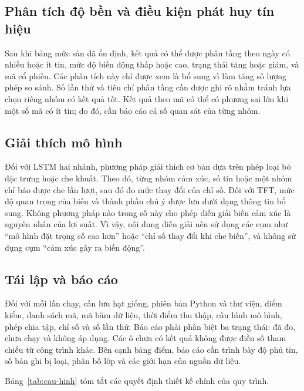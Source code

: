 \documentclass[12pt, a4paper, oneside]{report}
\begin{document}
\subsection{Phân tích độ bền và điều kiện phát huy tín hiệu}

Sau khi bảng mức sàn đã ổn định, kết quả có thể được phân tầng theo ngày có nhiều
hoặc ít tin, mức độ biến động thấp hoặc cao, trạng thái tăng hoặc giảm, và mã cổ
phiếu. Các phân tích này chỉ được xem là bổ sung vì làm tăng số lượng phép so sánh.
Số lần thử và tiêu chí phân tầng cần được ghi rõ nhằm tránh lựa chọn riêng nhóm có
kết quả tốt. Kết quả theo mã có thể có phương sai lớn khi một số mã có ít tin; do đó,
cần báo cáo cả số quan sát của từng nhóm.

\subsection{Giải thích mô hình}

Đối với LSTM hai nhánh, phương pháp giải thích cơ bản dựa trên phép loại bỏ đặc trưng
hoặc che khuất. Theo đó, từng nhóm cảm xúc, số tin hoặc một nhóm chỉ báo được che lần
lượt, sau đó đo mức thay đổi của chỉ số. Đối với TFT, mức độ quan trọng của biến và
thành phần chú ý được lưu dưới dạng thông tin bổ sung. Không phương pháp nào trong
số này cho phép diễn giải biến cảm xúc là nguyên nhân của lợi suất. Vì vậy, nội dung
diễn giải nên sử dụng các cụm như ``mô hình đặt trọng số cao hơn'' hoặc ``chỉ số thay
đổi khi che biến'', và không sử dụng cụm ``cảm xúc gây ra biến động''.

\subsection{Tái lập và báo cáo}

Đối với mỗi lần chạy, cần lưu hạt giống, phiên bản Python và thư viện, điểm kiểm, danh
sách mã, mã băm dữ liệu, thời điểm thu thập, cấu hình mô hình, phép chia tập, chỉ số
và số lần thử. Báo cáo phải phân biệt ba trạng thái: đã đo, chưa chạy và không áp
dụng. Các ô chưa có kết quả không được điền số tham chiếu từ công trình khác. Bên
cạnh bảng điểm, báo cáo cần trình bày độ phủ tin, số bản ghi bị loại, phân bố lớp và
các giới hạn của nguồn dữ liệu.

Bảng~\ref{tab:cau-hinh} tóm tắt các quyết định thiết kế chính của quy trình.
\end{document}
